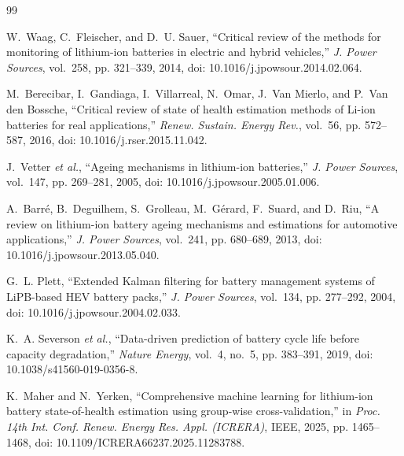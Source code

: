 \documentclass[12pt,a4paper]{amritareport}
\begin{document}
\begin{thebibliography}{99}

W.~Waag, C.~Fleischer, and D.~U. Sauer, ``Critical review of the methods for monitoring of lithium-ion batteries in electric and hybrid vehicles,'' \emph{J. Power Sources}, vol.~258, pp. 321--339, 2014, doi: 10.1016/j.jpowsour.2014.02.064.

M.~Berecibar, I.~Gandiaga, I.~Villarreal, N.~Omar, J.~Van Mierlo, and P.~Van den Bossche, ``Critical review of state of health estimation methods of {Li-ion} batteries for real applications,'' \emph{Renew. Sustain. Energy Rev.}, vol.~56, pp. 572--587, 2016, doi: 10.1016/j.rser.2015.11.042.

J.~Vetter \emph{et al.}, ``Ageing mechanisms in lithium-ion batteries,'' \emph{J. Power Sources}, vol.~147, pp. 269--281, 2005, doi: 10.1016/j.jpowsour.2005.01.006.

A.~Barr\'e, B.~Deguilhem, S.~Grolleau, M.~G\'erard, F.~Suard, and D.~Riu, ``A review on lithium-ion battery ageing mechanisms and estimations for automotive applications,'' \emph{J. Power Sources}, vol.~241, pp. 680--689, 2013, doi: 10.1016/j.jpowsour.2013.05.040.

G.~L. Plett, ``Extended {Kalman} filtering for battery management systems of {LiPB}-based {HEV} battery packs,'' \emph{J. Power Sources}, vol.~134, pp. 277--292, 2004, doi: 10.1016/j.jpowsour.2004.02.033.

K.~A. Severson \emph{et al.}, ``Data-driven prediction of battery cycle life before capacity degradation,'' \emph{Nature Energy}, vol.~4, no.~5, pp. 383--391, 2019, doi: 10.1038/s41560-019-0356-8.

K.~Maher and N.~Yerken, ``Comprehensive machine learning for lithium-ion battery state-of-health estimation using group-wise cross-validation,'' in \emph{Proc. 14th Int. Conf. Renew. Energy Res. Appl. (ICRERA)}, IEEE, 2025, pp. 1465--1468, doi: 10.1109/ICRERA66237.2025.11283788.


\end{thebibliography}
\end{document}
